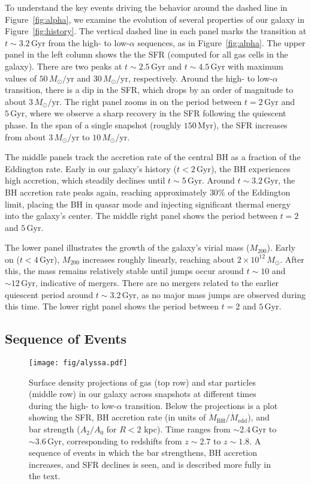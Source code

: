 \documentclass[twocolumn]{aastex631}
\newcommand{\Msun}{\ensuremath{M_{\odot}}}
\newcommand{\Gyr}{\ensuremath{\textrm{Gyr}}}
\newcommand{\Myr}{\ensuremath{\textrm{Myr}}}
\begin{document}
To understand the key events driving the behavior around the dashed line in Figure~\ref{fig:alpha}, we examine the evolution of several properties of our galaxy in Figure~\ref{fig:history}. The vertical dashed line in each panel marks the transition at $t\sim3.2\,\Gyr$ from the high- to low-$\alpha$ sequences, as in Figure~\ref{fig:alpha}. The upper panel in the left column shows the the SFR (computed for all gas cells in the galaxy). There are two peaks at $t\sim2.5\,\Gyr$ and $t\sim4.5\,\Gyr$ with maximum values of $50\,\Msun/\textrm{yr}$ and $30\,\Msun/\textrm{yr}$, respectively. Around the high- to low-$\alpha$ transition, there is a dip in the SFR, which drops by an order of magnitude to about $3\,\Msun/\textrm{yr}$. The right panel zooms in on the period between $t=2\,\Gyr$ and $5\,\Gyr$, where we observe a sharp recovery in the SFR following the quiescent phase. In the span of a single snapshot (roughly $150\,\Myr$), the SFR increases from about $3\,\Msun/\textrm{yr}$ to $10\,\Msun/\textrm{yr}$.

The middle panels track the accretion rate of the central BH as a fraction of the Eddington rate. Early in our galaxy's history ($t<2\,\Gyr$), the BH experiences high accretion, which steadily declines until $t\sim5\,\Gyr$. Around $t\sim3.2\,\Gyr$, the BH accretion rate peaks again, reaching approximately $30\%$ of the Eddington limit, placing the BH in quasar mode and injecting significant thermal energy into the galaxy's center. The middle right panel shows the period between $t=2$ and $5\,\Gyr$.

The lower panel illustrates the growth of the galaxy's virial mass ($M_{200}$). Early on ($t<4\,\Gyr$), $M_{200}$ increases roughly linearly, reaching about $2 \times 10^{12}\,\Msun$. After this, the mass remains relatively stable until jumps occur around $t\sim10$ and $\sim12\,\Gyr$, indicative of mergers. There are no mergers related to the earlier quiescent period around $t\sim3.2\,\Gyr$, as no major mass jumps are observed during this time. The lower right panel shows the period between $t=2$ and $5\,\Gyr$.

\subsection{Sequence of Events}\label{ssec:sequence_of_events}
\begin{figure*}
  \centering
  \texttt{[image: fig/alyssa.pdf]}
  \caption{Surface density projections of gas (top row) and star particles (middle row) in our galaxy across snapshots at different times during the high- to low-$\alpha$ transition. Below the projections is a plot showing the SFR, BH accretion rate (in units of $\dot{M}_{\textrm{BH}}/\dot{M}_{\textrm{edd}}$), and bar strength ($A_2/A_0$ for $R<2$ kpc). Time ranges from $\sim2.4\,\textrm{Gyr}$ to $\sim3.6\,\textrm{Gyr}$, corresponding to redshifts from $z\sim2.7$ to $z\sim1.8$. A sequence of events in which the bar strengthens, BH accretion increases, and SFR declines is seen, and is described more fully in the text.}
  \label{fig:seq}
\end{figure*}
\end{document}
